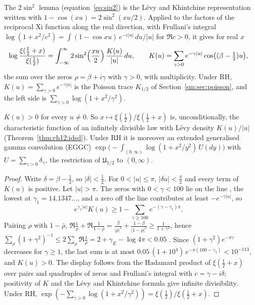 The $2\sin^2$ lemma (equation~\eqref{eq:sin2}) is the L\'evy and Khintchine representation written with $1-\cos(xu)=2\sin^2(xu/2)$. Applied to the factors of the reciprocal Xi function along the real direction, with Frullani's integral $\log(1+x^2/c^2)=\int(1-\cos xu)\,e^{-c|u|}\,du/|u|$ for $\Re c>0$, it gives for real $x$
\begin{equation}\label{bsy:eq:sin2}
\log\frac{\xi(\frac12+x)}{\xi(\frac12)}=\int_{-\infty}^\infty2\sin^2\Bigl(\frac{xu}{2}\Bigr)\,\frac{K(u)}{|u|}\,du,\qquad K(u)=\sum_{\gamma>0}e^{-\gamma|u|}\cos\bigl((\beta-\tfrac12)u\bigr),
\end{equation}
the sum over the zeros $\rho=\beta+i\gamma$ with $\gamma>0$, with multiplicity. Under RH, $K(u)=\sum_{\gamma>0}e^{-\gamma|u|}$ is the Poisson trace $K_{1/2}$ of Section~\ref{sm:sec:poisson}, and the left side is $\sum_{\gamma>0}\log(1+x^2/\gamma^2)$.

\begin{proposition}\label{bsy:prop:kpos}
$K(u)>0$ for every $u\ne0$. So $x\mapsto\xi(\frac12)/\xi(\frac12+x)$ is, unconditionally, the characteristic function of an infinitely divisible law with L\'evy density $K(u)/|u|$ (Theorem~\ref{thm:ch12:idsd}). Under RH it is moreover an extended generalised gamma convolution (EGGC) $\exp\bigl(-\int_{(0,\infty)}\log(1+x^2/y^2)\,U(dy)\bigr)$ with $U=\sum_{\gamma>0}\delta_\gamma$, the restriction of $\mathfrak U_{1/2}$ to $(0,\infty)$.
\end{proposition}

\begin{proof}
Write $\delta=\beta-\frac12$, so $|\delta|<\frac12$. For $0<|u|\le\pi$, $|\delta u|<\frac\pi2$ and every term of $K(u)$ is positive. Let $|u|>\pi$. The zeros with $0<\gamma<100$ lie on the line \cite{PT21}, the lowest at $\gamma_1=14.1347\ldots$, and a zero off the line contributes at least $-e^{-\gamma|u|}$, so
\[
e^{\gamma_1|u|}K(u)\ge1-\sum_{\gamma\ge100}e^{-(\gamma-\gamma_1)\pi}.
\]
Pairing $\rho$ with $1-\bar\rho$, $\Re\frac1\rho+\Re\frac1{1-\bar\rho}=\frac\beta{|\rho|^2}+\frac{1-\beta}{|1-\rho|^2}\ge\frac1{1+\gamma^2}$, hence $\sum_\rho(1+\gamma^2)^{-1}\le2\sum_\rho\Re\frac1\rho=2+\gamma_E-\log4\pi<0.05$ \cite[Chapter 12]{Davenport}. Since $(1+\gamma^2)e^{-\pi\gamma}$ decreases for $\gamma\ge1$, the last sum is at most $0.05\,(1+10^4)\,e^{-\pi(100-\gamma_1)}<10^{-113}$, and $K(u)>0$. The display follows from the Hadamard product of $\xi(\frac12+x)$ over pairs and quadruples of zeros and Frullani's integral with $c=\gamma-i\delta$; positivity of $K$ and the L\'evy and Khintchine formula give infinite divisibility. Under RH, $\exp(-\sum_{\gamma>0}\log(1+x^2/\gamma^2))=\xi(\frac12)/\xi(\frac12+x)$.
\end{proof}

